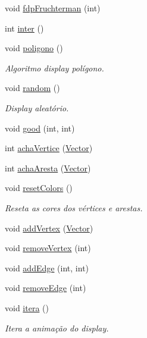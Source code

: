 \begin{DoxyCompactItemize}
void \hyperlink{classGraphDisplay_aaf2ed129c6647b38b0170133ae4f0823}{fdp\+Fruchterman} (int)
\item 
int \hyperlink{classGraphDisplay_aa9300be5d20b62596cf709223a3dd67d}{inter} ()
\item 
\mbox{\label{classGraphDisplay_a3dda94c25e4e6190700f2fa248cabca7}} 
void \hyperlink{classGraphDisplay_a3dda94c25e4e6190700f2fa248cabca7}{poligono} ()
\begin{DoxyCompactList}\small\item\em Algoritmo display polígono. \end{DoxyCompactList}\item 
\mbox{\label{classGraphDisplay_a914629b25bf3322736df48bc4f9771a5}} 
void \hyperlink{classGraphDisplay_a914629b25bf3322736df48bc4f9771a5}{random} ()
\begin{DoxyCompactList}\small\item\em Display aleatório. \end{DoxyCompactList}\item 
void \hyperlink{classGraphDisplay_a27d6e383e51648eff72a3ac43abc5c0c}{good} (int, int)
\item 
int \hyperlink{classGraphDisplay_a8a07eca019e47afd54a207dc66195b3f}{acha\+Vertice} (\hyperlink{classVector}{Vector})
\item 
int \hyperlink{classGraphDisplay_ad14587ecf7f118cf8d071231de2e5809}{acha\+Aresta} (\hyperlink{classVector}{Vector})
\item 
\mbox{\label{classGraphDisplay_a1c6b7b9966a82c8b62983221f5b43dfa}} 
void \hyperlink{classGraphDisplay_a1c6b7b9966a82c8b62983221f5b43dfa}{reset\+Colors} ()
\begin{DoxyCompactList}\small\item\em Reseta as cores dos vértices e arestas. \end{DoxyCompactList}\item 
void \hyperlink{classGraphDisplay_aaa444bf8a296fb97a054c48e8e4a826f}{add\+Vertex} (\hyperlink{classVector}{Vector})
\item 
void \hyperlink{classGraphDisplay_adc84fa190931d2a2f73463ed211e0b71}{remove\+Vertex} (int)
\item 
void \hyperlink{classGraphDisplay_a77ab2c4ae2c7facff5034e140e43ed73}{add\+Edge} (int, int)
\item 
void \hyperlink{classGraphDisplay_adb5477315cf0e2435556c999a7c0cb8c}{remove\+Edge} (int)
\item 
\mbox{\label{classGraphDisplay_a977dc7ae1425c60e7c87de6cabe9e29f}} 
void \hyperlink{classGraphDisplay_a977dc7ae1425c60e7c87de6cabe9e29f}{itera} ()
\begin{DoxyCompactList}\small\item\em Itera a animação do display. \end{DoxyCompactList}\end{DoxyCompactItemize}
